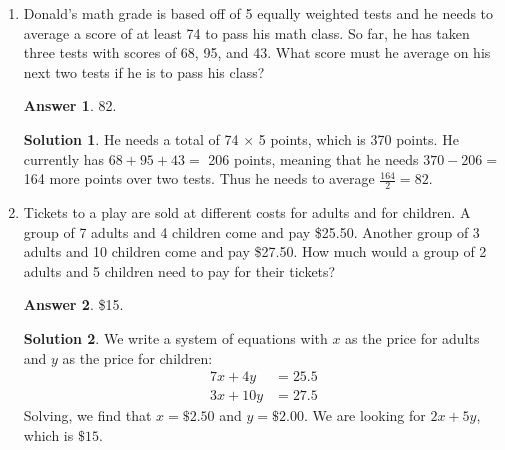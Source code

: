 \documentclass[11pt]{article}
\theoremstyle{definition}
\newtheorem*{solution}{Solution}
\newtheorem*{answer}{Answer}
\newcommand{\fdbox}[2]{\fbox{\sffamily\LARGE\vphantom y#1: \bfseries #2} \par\vspace{1em}} %
\begin{document}
\newcommand{\logo}{%
\begin{minipage}[b]{22em}
\centering\noindent
\\[0.5em]
\begin{minipage}[t][4em][t]{12em} \centering
{\huge \bfseries ${\bf 26^{\text{th}}}$ TJIMO } \\
\textsc{\large Alexandria, Virginia}
\end{minipage}
\end{minipage}
\vspace*{-0.05em}
}
\newcommand{\sevenpoints}{}
\newcommand{\righthead}{\fdbox{Round}{Practice Team Solutions}}

\begin{enumerate}


\item Donald's math grade is based off of 5 equally weighted tests and he needs to average a score of at least 74 to pass his math class. So far, he has taken three tests with scores of 68, 95, and 43. What score must he average on his next two tests if he is to pass his class?

\begin{answer}
82.
\end{answer}
\begin{solution}
He needs a total of 74 $\times$ 5 points, which is 370 points. He currently has $68+95+43 =$ 206 points, meaning that he needs $370-206 =$ 164 more points over two tests. Thus he needs to average $\frac{164}{2} = \boxed{82}$.
\end{solution}
\item Tickets to a play are sold at different costs for adults and for children. A group of 7 adults and 4 children come and pay \$25.50. Another group of 3 adults and 10 children come and pay \$27.50. How much would a group of 2 adults and 5 children need to pay for their tickets?

\begin{answer}
\$15.
\end{answer}
\begin{solution}
We write a system of equations with $x$ as the price for adults and $y$ as the price for children:
\begin{align*}
7x + 4y &= 25.5 \\
3x + 10y &= 27.5
\end{align*}
Solving, we find that $x = \$2.50$ and $y = \$2.00$. We are looking for $2x+5y$, which is $\boxed{\$15}$.
\end{solution}


\end{enumerate}
\end{document}
